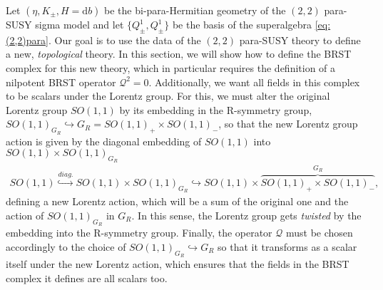 \documentclass[letterpaper,12pt]{article}
\newcommand{\QQ}{\mathcal{Q}}
\newcommand{\rd}{\mathrm{d}}
\theoremstyle{definition}
\theoremstyle{remark}
\theoremstyle{examples}
\begin{document}
Let $(\eta,K_\pm,H=\rd b)$ be the bi-para-Hermitian geometry of the $(2,2)$ para-SUSY sigma model and let $\{Q^1_\pm,Q^1_\pm\}$ be the basis of the superalgebra \eqref{eq:(2,2)para}. Our goal is to use the data of the $(2,2)$ para-SUSY theory to define a new, {\it topological} theory. In this section, we will show how to define the BRST complex for this new theory, which in particular requires the definition of a nilpotent BRST operator $\QQ^2=0$. Additionally, we want all fields in this complex to be scalars under the Lorentz group. For this, we must alter the original Lorentz group $SO(1,1)$ by its embedding in the R-symmetry group, $SO(1,1)_{G_R}\hookrightarrow G_R=SO(1,1)_+\times SO(1,1)_-$, so that the new Lorentz group action is given by the diagonal embedding of $SO(1,1)$ into $SO(1,1)\times SO(1,1)_{G_R}$
\begin{align}\label{embeddings}
SO(1,1)\overset{diag.}{\hookrightarrow} SO(1,1)\!\times\! SO(1,1)_{G_R}\!\!\hookrightarrow SO(1,1)\!\times\! \overbrace{SO(1,1)_+\!\times\! SO(1,1)_-}^{G_R},
\end{align}
defining a new Lorentz action, which will be a sum of the original one and the action of $SO(1,1)_{G_R}$ in $G_R$. In this sense, the Lorentz group gets {\it twisted} by the embedding into the R-symmetry group. Finally, the operator $\QQ$ must be chosen accordingly to the choice of $SO(1,1)_{G_R}\hookrightarrow G_R$ so that it transforms as a scalar itself under the new Lorentz action, which ensures that the fields in the BRST complex it defines are all scalars too.
\end{document}
